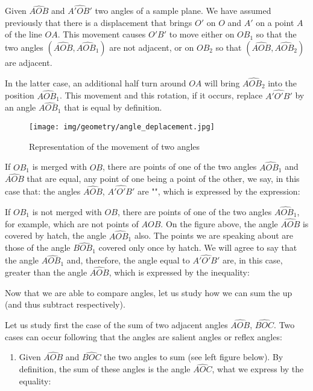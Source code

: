 \begin{enumerate}
		Given $\widehat{AOB}$ and $\widehat{A'OB'}$  two angles of a sample plane. We have assumed previously that there is a displacement that brings $O'$ on $O$ and $A'$ on a point $A$ of the line $OA$. This movement causes $O'B'$ to move either on $OB_1$ so that the two angles $(\widehat{AOB},\widehat{AOB_1})$ are not adjacent, or on $OB_2$ so that $(\widehat{AOB},\widehat{AOB_2})$ are adjacent. 

		In the latter case, an additional half turn around $OA$ will bring $\widehat{AOB_2}$ into the position $\widehat{AOB_1}$. This movement and this rotation, if it occurs, replace $\widehat{A'O'B'}$ by an angle $\widehat{AOB_1}$ that is equal by definition.
		
		\begin{figure}[H]
			\centering
			\texttt{[image: img/geometry/angle\_deplacement.jpg]}
			\caption{Representation of the movement of two angles}
		\end{figure}
		If $OB_1$ is merged with $OB$, there are points of one of the two angles $\widehat{AOB_1}$ and $\widehat{AOB}$ that are equal, any point of one being a point of the other, we say, in this case that: the angles $\widehat{AOB}$, $\widehat{A'O'B'}$ are "", which is expressed by the expression:
		
		If $OB_1$ is not merged with $OB$, there are points of one of the two angles $\widehat{AOB_1}$, for example, which are not points of $AOB$. On the figure above, the angle $\widehat{AOB}$ is covered by hatch, the angle $\widehat{AOB_1}$ also. The points we are speaking about are those of the angle $\widehat{BOB_1}$ covered only once by hatch. We will agree to say that the angle $\widehat{AOB_1}$ and, therefore, the angle equal to $\widehat{A'O'B'}$ are, in this case, greater than the angle $\widehat{AOB}$, which is expressed by the inequality:
		
		Now that we are able to compare angles, let us study how we can sum the up (and thus subtract respectively).
		
		Let us study first the case of the sum of two adjacent angles $\widehat{AOB}$, $\widehat{BOC}$. Two cases can occur following that the angles are salient angles or reflex angles:
		\begin{enumerate}
			\item Given $\widehat{AOB}$ and $\widehat{BOC}$ the two angles to sum (see left figure below). By definition, the sum of these angles is the angle $\widehat{AOC}$, what we express by the equality:
			

\end{enumerate}
\end{enumerate}
